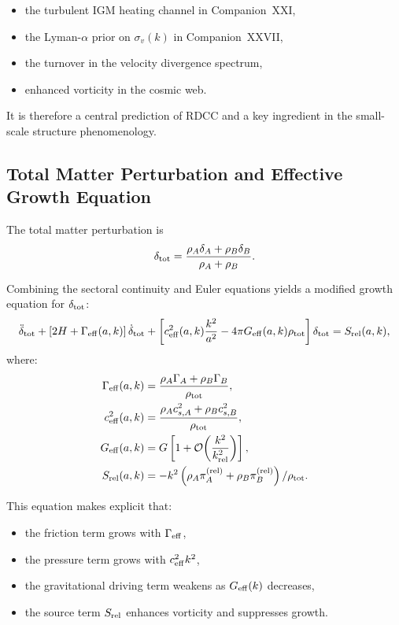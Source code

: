 \documentclass[11pt,a4paper]{article}
\begin{document}
\begin{itemize}
\item the turbulent IGM heating channel in Companion~XXI,
\item the Lyman-$\alpha$ prior on $\sigma_{v}(k)$ in Companion~XXVII,
\item the turnover in the velocity divergence spectrum,
\item enhanced vorticity in the cosmic web.
\end{itemize}

It is therefore a central prediction of RDCC and a key ingredient in the small-scale
structure phenomenology.

\subsection{Total Matter Perturbation and Effective Growth Equation}

The total matter perturbation is
\begin{equation}
\delta_{\rm tot}
= \frac{\rho_A\delta_A + \rho_B\delta_B}{\rho_A + \rho_B}.
\end{equation}

Combining the sectoral continuity and Euler equations yields a modified growth equation
for $\delta_{\rm tot}$:
\begin{equation}
\ddot{\delta}_{\rm tot}
+ \left[ 2H + \Gamma_{\rm eff}(a,k) \right]\dot{\delta}_{\rm tot}
+ \left[ c_{\rm eff}^2(a,k)\frac{k^2}{a^2}
- 4\pi G_{\rm eff}(a,k)\rho_{\rm tot} \right]\delta_{\rm tot}
= S_{\rm rel}(a,k),
\end{equation}
where:
\begin{align}
\Gamma_{\rm eff}(a,k) &=
\frac{\rho_A\Gamma_A + \rho_B\Gamma_B}{\rho_{\rm tot}}, \\
c_{\rm eff}^2(a,k) &=
\frac{\rho_A c_{s,A}^2 + \rho_B c_{s,B}^2}{\rho_{\rm tot}}, \\
G_{\rm eff}(a,k) &=
G\left[1 + \mathcal{O}\!\left(\frac{k^2}{k_{\rm rel}^2}\right)\right], \\
S_{\rm rel}(a,k) &=
-k^2\left(\rho_A\pi_A^{\rm (rel)} + \rho_B\pi_B^{\rm (rel)}\right)/\rho_{\rm tot}.
\end{align}

This equation makes explicit that:
\begin{itemize}
\item the friction term grows with $\Gamma_{\rm eff}$,
\item the pressure term grows with $c_{\rm eff}^2 k^2$,
\item the gravitational driving term weakens as $G_{\rm eff}(k)$ decreases,
\item the source term $S_{\rm rel}$ enhances vorticity and suppresses growth.
\end{itemize}
\end{document}
